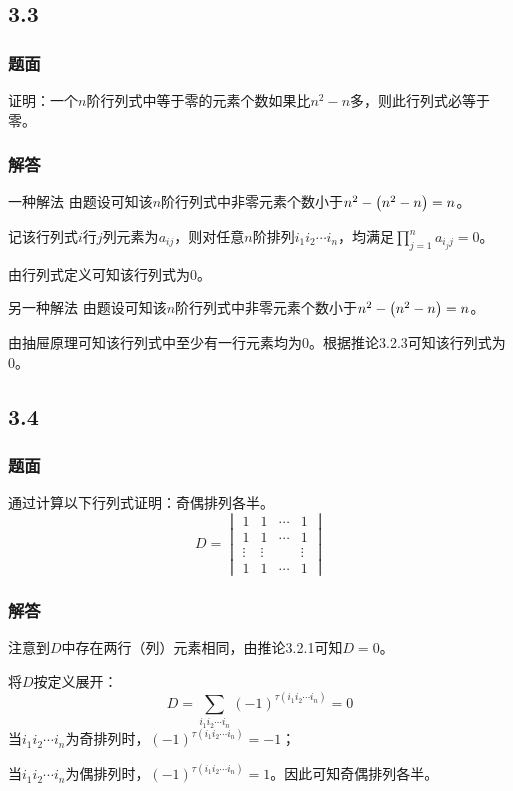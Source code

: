 \documentclass[10pt,xcolor=svgnames]{beamer} %
\begin{document}
\subsection*{3.3}
\begin{frame}
    \frametitle{题面}
    证明：一个\(n\)阶行列式中等于零的元素个数如果比\(n^2-n\)多，则此行列式必等于零。
\end{frame}
\begin{frame}
    \frametitle{解答}
    \begin{block}{一种解法}
        由题设可知该\(n\)阶行列式中非零元素个数小于\(n^2-\left( n^2-n \right)=n\)。

        记该行列式\(i\)行\(j\)列元素为\(a_{ij}\)，则对任意\(n\)阶排列\(i_1i_2\cdots i_n\)，均满足\(\prod_{j=1}^{n}a_{i_jj}=0\)。

        由行列式定义可知该行列式为\(0\)。
    \end{block}
    \pause
    \begin{block}{另一种解法}
        由题设可知该\(n\)阶行列式中非零元素个数小于\(n^2-\left( n^2-n \right)=n\)。

        由抽屉原理可知该行列式中至少有一行元素均为\(0\)。根据推论3.2.3可知该行列式为\(0\)。
    \end{block}
\end{frame}

\subsection*{3.4}
\begin{frame}
    \frametitle{题面}
    通过计算以下行列式证明：奇偶排列各半。
    \begin{equation*}
        D=
        \begin{vmatrix}
            1      & 1      & \cdots & 1      \\
            1      & 1      & \cdots & 1      \\
            \vdots & \vdots &        & \vdots \\
            1      & 1      & \cdots & 1
        \end{vmatrix}
    \end{equation*}
\end{frame}
\begin{frame}
    \frametitle{解答}
    注意到\(D\)中存在两行（列）元素相同，由推论3.2.1可知\(D=0\)。

    将\(D\)按定义展开：
    \begin{equation*}
        D=\sum_{i_1i_2\cdots i_n}(-1)^{\tau(i_1i_2\cdots i_n)}=0
    \end{equation*}
    当\(i_1i_2\cdots i_n\)为奇排列时，\((-1)^{\tau(i_1i_2\cdots i_n)}=-1\)；

    当\(i_1i_2\cdots i_n\)为偶排列时，\((-1)^{\tau(i_1i_2\cdots i_n)}=1\)。因此可知奇偶排列各半。
\end{frame}
\end{document}
